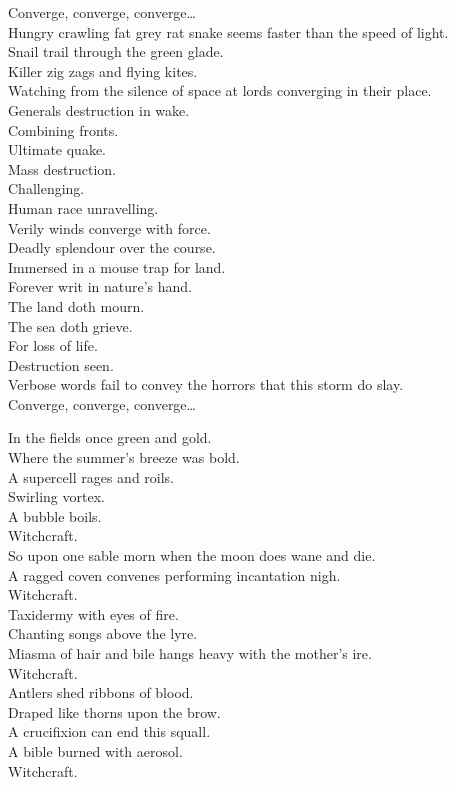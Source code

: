 Converge, converge, converge… \\

Hungry crawling fat grey rat snake seems faster than the speed of light. \\
Snail trail through the green glade. \\
Killer zig zags and flying kites. \\
Watching from the silence of space at lords converging in their place. \\
Generals destruction in wake. \\
Combining fronts. \\
Ultimate quake. \\

Mass destruction. \\
Challenging. \\
Human race unravelling. \\

Verily winds converge with force. \\
Deadly splendour over the course. \\
Immersed in a mouse trap for land. \\
Forever writ in nature's hand. \\
The land doth mourn. \\
The sea doth grieve. \\
For loss of life. \\
Destruction seen. \\
Verbose words fail to convey the horrors that this storm do slay. \\

Converge, converge, converge… \\



In the fields once green and gold. \\
Where the summer's breeze was bold. \\
A supercell rages and roils. \\
Swirling vortex. \\
A bubble boils. \\
Witchcraft. \\
So upon one sable morn when the moon does wane and die. \\
A ragged coven convenes performing incantation nigh. \\
Witchcraft. \\
Taxidermy with eyes of fire. \\
Chanting songs above the lyre. \\
Miasma of hair and bile hangs heavy with the mother's ire. \\
Witchcraft. \\
Antlers shed ribbons of blood. \\
Draped like thorns upon the brow. \\
A crucifixion can end this squall. \\
A bible burned with aerosol. \\
Witchcraft. \\

